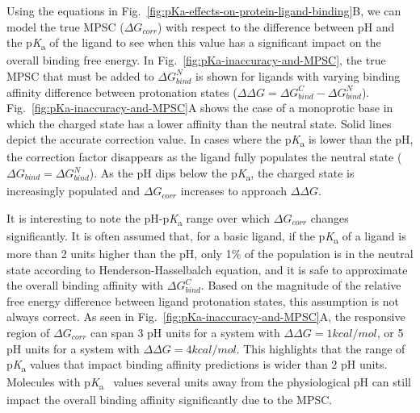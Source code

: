\documentclass[9pt,lineno,final]{elife}
\newcommand{\pKa}{p\textit{K}\textsubscript{a}}
\begin{document}
Using the equations in Fig.~\ref{fig:pKa-effects-on-protein-ligand-binding}B, we can model the true MPSC ($\Delta G_{corr}$) with respect to the difference between pH and the \pKa{} of the ligand to see when this value has a significant impact on the overall binding free energy. 
In Fig.~\ref{fig:pKa-inaccuracy-and-MPSC}, the true MPSC that must be added to $\Delta G_{bind}^{N}$ is shown for ligands with varying binding affinity difference between protonation states ($\Delta\Delta G = \Delta G_{bind}^{C} - \Delta G_{bind}^{N}$). Fig.~\ref{fig:pKa-inaccuracy-and-MPSC}A shows the case of a monoprotic base in which the charged state has a lower affinity than the neutral state. 
Solid lines depict the accurate correction value. 
In cases where the \pKa{} is lower than the pH, the correction factor disappears as the ligand fully populates the neutral state ($\Delta G_{bind} = \Delta G_{bind}^{N}$). 
As the pH dips below the \pKa{}, the charged state is increasingly populated and $\Delta G_{corr}$ increases to approach $\Delta\Delta G$. 

It is interesting to note the pH-\pKa{} range over which $\Delta G_{corr}$ changes significantly.
It is often assumed that, for a basic ligand, if the \pKa{} of a ligand is more than 2 units higher than the pH, only 1\% of the population is in the neutral state according to Henderson-Hasselbalch equation, and it is safe to approximate the overall binding affinity with $\Delta G_{bind}^{C}$. 
Based on the magnitude of the relative free energy difference between ligand protonation states, this assumption is not always correct. 
As seen in Fig.~\ref{fig:pKa-inaccuracy-and-MPSC}A, the responsive region of $\Delta G_{corr}$ can span 3 pH units for a system with $\Delta\Delta G = 1 kcal/mol$, or 5 pH units for a system with $\Delta\Delta G = 4 kcal/mol$. 
This highlights that the range of \pKa{} values that impact binding affinity predictions is wider than 2 pH units. 
Molecules with \pKa{}~ values several units away from the physiological pH can still impact the overall binding affinity significantly due to the MPSC. 
\end{document}
